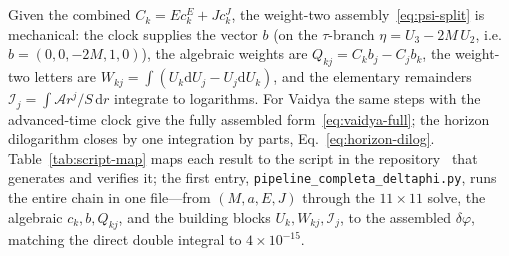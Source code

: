 \documentclass[12pt]{iopart}
\newcommand{\Ehat}{\hat E}
\newcommand{\dd}{\mathrm{d}}
\begin{document}
Given the combined $C_k=\Ehat c_k^{E}+J c_k^{J}$, the weight-two
assembly~\eqref{eq:psi-split} is mechanical: the clock supplies the vector $b$ (on
the $\tau$-branch $\eta=U_3-2M\,U_2$, i.e.\ $b=(0,0,-2M,1,0)$), the algebraic
weights are $Q_{kj}=C_kb_j-C_jb_k$, the weight-two
letters are $W_{kj}=\int(U_k\dd U_j-U_j\dd U_k)$, and the elementary remainders
$\mathcal{I}_j=\int\mathcal{A}r^j/S\,\dd r$ integrate to logarithms. For Vaidya the
same steps with the advanced-time clock give the fully assembled
form~\eqref{eq:vaidya-full}; the horizon dilogarithm closes by one integration by
parts, Eq.~\eqref{eq:horizon-dilog}. Table~\ref{tab:script-map} maps each result to
the script in the repository~\cite{Rosignoli2026Code} that generates and verifies it;
the first entry, \texttt{pipeline\_completa\_deltaphi.py}, runs the entire chain in one
file---from $(M,a,E,J)$ through the $11\times11$ solve, the algebraic $c_k,b,Q_{kj}$,
and the building blocks $U_k,W_{kj},\mathcal{I}_j$, to the assembled $\delta\varphi$,
matching the direct double integral to $4\times10^{-15}$.
\end{document}
